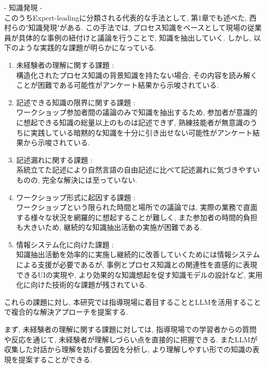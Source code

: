 - 知識発現 -\\
このうちExpert-leadingに分類される代表的な手法として, 第1章でも述べた, 西村らの"知識発現"\cite{Nishimura2017}がある. この手法では, プロセス知識をベースとして現場の従業員が具体的な事例の紐付けと議論を行うことで, 知識を抽出していく. しかし, 以下のような実践的な課題が明らかになっている.
\begin{enumerate}
    \item 未経験者の理解に関する課題 :\\
    構造化されたプロセス知識の背景知識を持たない場合, その内容を読み解くことが困難である可能性がアンケート結果から示唆されている.
    
    \item 記述できる知識の限界に関する課題 :\\
    ワークショップ参加者間の議論のみで知識を抽出するため, 参加者が意識的に想起できる知識の総量以上のものは記述できず, 熟練技能者が無意識のうちに実践している暗黙的な知識を十分に引き出せない可能性がアンケート結果から示唆されている.
    
    \item 記述漏れに関する課題 :\\
    系統立てた記述により自然言語の自由記述に比べて記述漏れに気づきやすいものの, 完全な解決には至っていない.
    
    \item ワークショップ形式に起因する課題 :\\
    ワークショップという限られた時間と場所での議論では, 実際の業務で直面する様々な状況を網羅的に想起することが難しく, また参加者の時間的負担も大きいため, 継続的な知識抽出活動の実施が困難である.
    
    \item 情報システム化に向けた課題 :\\
    知識抽出活動を効率的に実施し継続的に改善していくためには情報システムによる支援が必要であるが, 事例とプロセス知識との関連性を直感的に表現できるUIの実現や, より効果的な知識想起を促す知識モデルの設計など, 実用化に向けた技術的な課題が残されている.
\end{enumerate}

これらの課題に対し, 本研究では指導現場に着目することとLLMを活用することで複合的な解決アプローチを提案する. 

まず, 未経験者の理解に関する課題に対しては, 指導現場での学習者からの質問や反応を通じて, 未経験者が理解しづらい点を直接的に把握できる. またLLMが収集した対話から理解を妨げる要因を分析し, より理解しやすい形での知識の表現を提案することができる.

